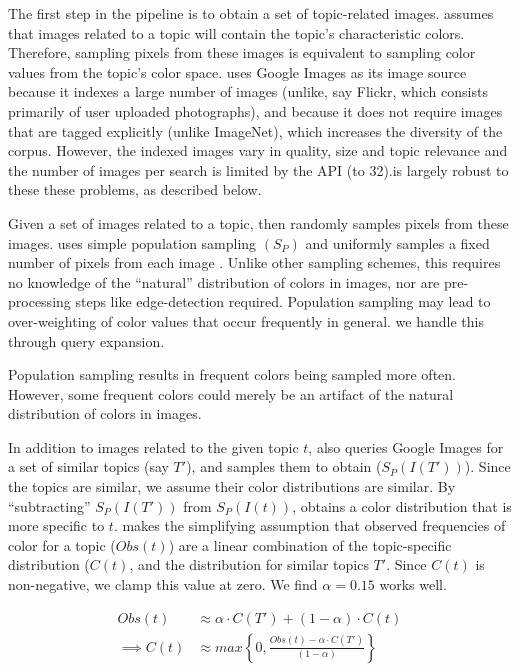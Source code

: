 
The first step in the \system pipeline is to obtain a set of topic-related images. \system assumes that images related to a topic will contain the topic's characteristic colors. Therefore, sampling pixels from these images is equivalent to sampling color values from the topic's color space. \system uses Google Images as its image source because it indexes a large number of images  (unlike, say Flickr, which consists primarily of user uploaded photographs), and because it does not require images that are tagged explicitly (unlike ImageNet), which increases the diversity of the corpus. However, the indexed images vary in quality, size and topic relevance and the number of images per search is limited by the API (to 32).\system is largely robust to these these problems, as described below. 

Given a set of images related to a topic, \system then randomly samples pixels from these images. \system uses simple population sampling $(S_{P})$ and uniformly samples a fixed number of pixels from each image . Unlike other sampling schemes, this requires no knowledge of the ``natural'' distribution of colors in images, nor are pre-processing steps like edge-detection required. Population sampling may lead to over-weighting of color values that occur frequently in general. we handle this through query expansion.

Population sampling results in frequent colors being sampled more often. However, some frequent colors could merely be an artifact of the natural distribution of colors in images. 

In addition to images related to the given topic $t$, \system also queries Google Images for a set of similar topics (say $T'$), and samples them to obtain ($S_{P}(I(T'))$). Since the topics are similar, we assume their color distributions are similar. By ``subtracting'' $S_{P}(I(T'))$ from $S_{P}(I(t))$, \system obtains a color distribution that is more specific to $t$. \system makes the simplifying assumption that observed frequencies of color for a topic ($Obs(t)$) are a linear combination of the topic-specific distribution ($C(t)$, and the distribution for similar topics $T'$. Since $C(t)$ is non-negative, we clamp this value at zero. We find $\alpha = 0.15$ works well.

\begin{align}
Obs(t) &\approx \alpha\cdot C(T') + (1-\alpha)\cdot C(t) \\
\label{linear-color}
\implies  C(t) &\approx max\left\{0,\frac{Obs(t) - \alpha\cdot C(T')}{(1-\alpha)}\right\}
\end{align}

